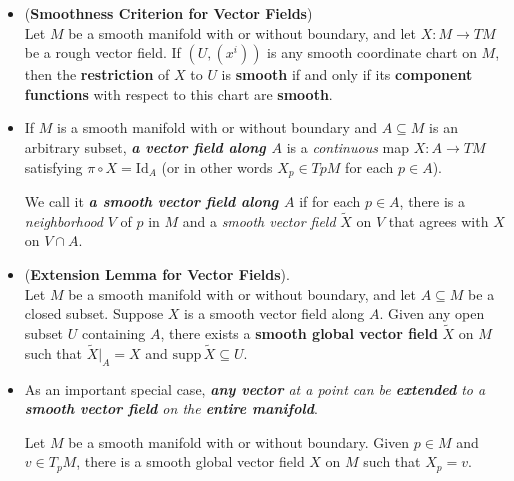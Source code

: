 \documentclass[11pt]{article}
\begin{document}
\begin{itemize}
\item 
\begin{proposition}\label{prop: vector_field_smooth_condition} (\textbf{Smoothness Criterion for Vector Fields}) \citep{lee2003introduction} \\
Let $M$ be a smooth manifold with or without boundary, and let $X: M \rightarrow TM$ be a rough vector field. If $(U, (x^i))$ is any smooth coordinate chart on $M$, then the \textbf{restriction} of $X$ to $U$ is \textbf{smooth} if and only if its \textbf{component functions} with respect to this chart are \textbf{smooth}.
\end{proposition}

\item \begin{definition}
If $M$ is a smooth manifold with or without boundary and $A \subseteq M$ is an arbitrary subset, \emph{\textbf{a vector field along $A$}} is a \emph{continuous} map $X: A \rightarrow TM$ satisfying $\pi \circ X = \text{Id}_A$ (or in other words $X_p \in TpM$  for each $p \in A$). 

We call it \emph{\textbf{a smooth vector field along $A$}} if for each $p \in A$, there is a \emph{neighborhood} $V$ of $p$ in $M$ and a \emph{smooth vector field} $\widetilde{X}$ on $V$ that agrees with $X$ on $V \cap A$.
\end{definition}

\item \begin{lemma} (\textbf{Extension Lemma for Vector Fields}). \citep{lee2003introduction} \\
Let $M$ be a smooth manifold with or without boundary, and let $A \subseteq M$ be a closed subset. Suppose $X$ is a smooth vector field along $A$. Given any open subset $U$ containing $A$, there exists a \textbf{smooth global vector field} $\widetilde{X}$ on $M$ such that $\widetilde{X}|_{A} = X$ and $\text{supp}\,\widetilde{X} \subseteq U$.
\end{lemma}

\item As an important special case, \emph{\textbf{any vector} at a point can be \textbf{extended} to a \textbf{smooth vector field} on the \textbf{entire manifold}}.
\begin{proposition}\label{prop: vector_field_extend_from_one_vector}
Let $M$ be a smooth manifold with or without boundary. Given $p \in M$ and $v \in T_{p}M$, there is a smooth global vector field $X$ on $M$ such that $X_p  = v$.
\end{proposition}


\end{itemize}
\end{document}
